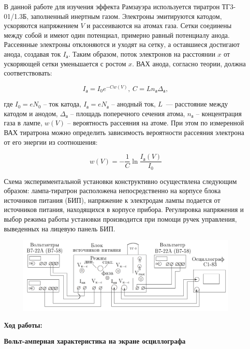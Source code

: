 \documentclass[a4paper, 12pt]{article}%
\begin{document}
	В данной работе для изучения эффекта Рамзауэра используется тиратрон ТГ3-01/1.3Б, заполненный инертным газом.  Электроны эмитируются катодом, ускоряются напряжением $V$ и рассеиваются на атомах газа.  Сетки соединены между собой и имеют один потенциал,  примерно равный потенциалу анода. Рассеянные электроны отклоняются и уходят на сетку, а оставшиеся достигают анода, создавая ток $I_{\text{а}}$.  Таким образом,  поток электронов на расстоянии $x$ от ускоряющей сетки уменьшается с ростом $x$.  ВАХ анода,  согласно теории, должна соответствовать:

\[I_{\text{а}} = I_0 e^{-Cw(V)}, \ C = L n_{\text{а}} \Delta_{\text{а}},\]

	где $I_0 = eN_0$ -- ток катода,  $I_{\text{а}} = eN_{\text{а}}$ -- анодный ток,  $L$~--- расстояние между катодом и анодом,  $\Delta_{\text{а}}$ -- площадь поперечного сечения атома,  $n_{\text{а}}$ -- концентрация газа в лампе,  $w(V)$ -- вероятность рассеяния на атоме.  При этом по измеренной ВАХ тиратрона можно определить зависимость вероятности рассеяния электрона от его энергии из соотношения:

\[w(V) = - \dfrac{1}{C}\ln{\dfrac{I_{\text{а}}(V)}{I_0}}\]

	Схема экспериментальной установки конструктивно осуществлена следующим образом: лампа-тиратрон расположена непосредственно на корпусе блока источников питания (БИП),  напряжение к электродам лампы подается от источников питания,  находящихся в корпусе прибора.  Регулировка напряжения и выбор режима работы установки производится при помощи ручек управления,  выведенных на лицевую панель БИП.

	\begin{figure}[h!]
		\centering
		\includegraphics[scale=0.4]{Схема_4.PNG}
	\end{figure}
	
\textbf{Ход работы:}\\\par

\textbf{Вольт-амперная характеристика на экране осциллографа}
\end{document}

